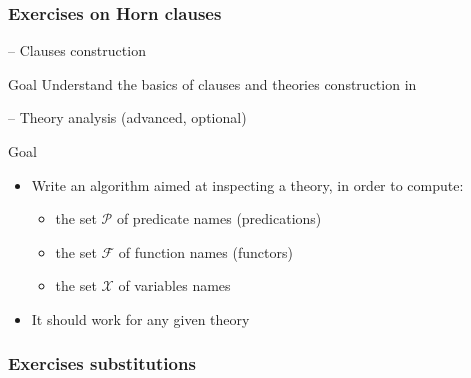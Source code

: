 \documentclass[presentation]{beamer}\mode<presentation>{\usetheme{AMSBolognaFC}}
\begin{document}
\subsubsection{Exercises on Horn clauses}

\startExercise{}

\begin{frame}{\currentExercise{} -- Clauses construction}
    \label{slide:first-exercise-on-clauses}
    \begin{block}{Goal}
        Understand the basics of clauses and theories construction in \twopkt{}
    \end{block}
\end{frame}

\startExercise{}

\begin{frame}{\currentExercise{} -- Theory analysis \hfill (advanced, \alert{optional})}
    \label{slide:second-exercise-on-clauses}
    \begin{block}{Goal}
        \begin{itemize}
            \item Write an algorithm aimed at inspecting a theory, in order to compute:
            \begin{itemize}
                \item the set $\mathcal{P}$ of predicate names (predications)
                \item the set $\mathcal{F}$ of function names (functors)
                \item the set $\mathcal{X}$ of variables names 
            \end{itemize}
            \item It should work \alert{for any given theory}
        \end{itemize}
    \end{block}
\end{frame}

\subsubsection{Exercises substitutions}

\startExercise{}
\end{document}
